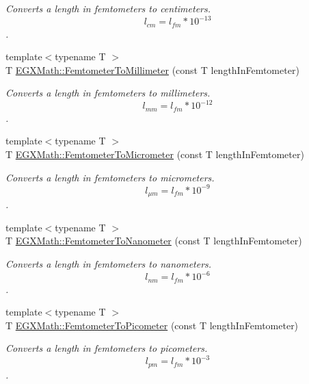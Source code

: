 \begin{DoxyCompactItemize}
\begin{DoxyCompactList}\small\item\em Converts a length in femtometers to centimeters. \[ l_{cm}=l_{fm} * 10^{-13} \]. \end{DoxyCompactList}\item 
{\footnotesize template$<$typename T $>$ }\\T \mbox{\hyperlink{group___e_g_x_math-_conversions-_length_conversions-_s_i-_femtometer-_s_i_ga2e6d6c0aad4502554b05f677ff248bc8}{E\+G\+X\+Math\+::\+Femtometer\+To\+Millimeter}} (const T length\+In\+Femtometer)
\begin{DoxyCompactList}\small\item\em Converts a length in femtometers to millimeters. \[ l_{mm}=l_{fm} * 10^{-12} \]. \end{DoxyCompactList}\item 
{\footnotesize template$<$typename T $>$ }\\T \mbox{\hyperlink{group___e_g_x_math-_conversions-_length_conversions-_s_i-_femtometer-_s_i_gac965667884f7a3449072effb83260fe8}{E\+G\+X\+Math\+::\+Femtometer\+To\+Micrometer}} (const T length\+In\+Femtometer)
\begin{DoxyCompactList}\small\item\em Converts a length in femtometers to micrometers. \[ l_{\mu m}=l_{fm} * 10^{-9} \]. \end{DoxyCompactList}\item 
{\footnotesize template$<$typename T $>$ }\\T \mbox{\hyperlink{group___e_g_x_math-_conversions-_length_conversions-_s_i-_femtometer-_s_i_ga61aa82ad734717567c959f0d4e840076}{E\+G\+X\+Math\+::\+Femtometer\+To\+Nanometer}} (const T length\+In\+Femtometer)
\begin{DoxyCompactList}\small\item\em Converts a length in femtometers to nanometers. \[ l_{nm}=l_{fm} * 10^{-6} \]. \end{DoxyCompactList}\item 
{\footnotesize template$<$typename T $>$ }\\T \mbox{\hyperlink{group___e_g_x_math-_conversions-_length_conversions-_s_i-_femtometer-_s_i_gadfcd6b374d4134cad0ac1ce7a8e50509}{E\+G\+X\+Math\+::\+Femtometer\+To\+Picometer}} (const T length\+In\+Femtometer)
\begin{DoxyCompactList}\small\item\em Converts a length in femtometers to picometers. \[ l_{pm}=l_{fm} * 10^{-3} \]. \end{DoxyCompactList}\item 

\end{DoxyCompactItemize}
